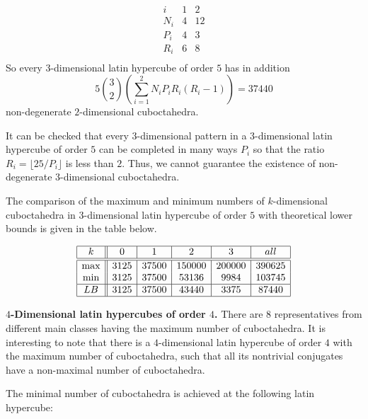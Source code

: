 \documentclass[a4paper]{article}
\begin{document}
$$
\begin{array}{c||c|c}
i & 1 & 2 \\
\hline
N_i & 4  & 12  \\
P_i & 4  & 3 \\
R_i & 6 &  8 \\
\end{array}
$$
So every $3$-dimensional latin hypercube of order $5$ has in addition 
$$  5  {3 \choose 2}  \left( \sum\limits_{i=1}^2 N_i P_i R_i(R_i - 1)  \right)   = 37440 $$  
non-degenerate $2$-dimensional cuboctahedra. 

It can be checked that every $3$-dimensional pattern in a $3$-dimensional latin hypercube of order $5$ can be completed in  many ways $P_i$  so that   the ratio  $R_i = \lfloor 25  / P_i  \rfloor$  is less than $2$. Thus, we cannot guarantee the existence of non-degenerate $3$-dimensional cuboctahedra. 

The comparison of the maximum and minimum numbers of $k$-dimensional cuboctahedra in $3$-dimensional latin hypercube of order $5$  with theoretical lower bounds is given in the table below.

$$
\begin{array}{|c||c|c|c|c|c|}
\hline
k & 0 & 1 & 2 & 3 & all \\
\hline
\hline
\max & 3125 & 37500 & 150000 & 200000 & 390625 \\
\min  & 3125 & 37500 & 53136 & 9984  & 103745\\
\hline
LB  & 3125 & 37500 & 43440 & 3375  & 87440\\
\hline
\end{array}
$$


\textbf{$4$-Dimensional latin hypercubes of order $4$.}
There are $8$  representatives from different main classes having the maximum number of cuboctahedra.  It is interesting to note that there is a $4$-dimensional latin hypercube of order $4$ with the maximum number of cuboctahedra, such that all its nontrivial conjugates have a non-maximal number of cuboctahedra. 

 The minimal number of cuboctahedra is achieved at the following latin hypercube:
 
\end{document}
